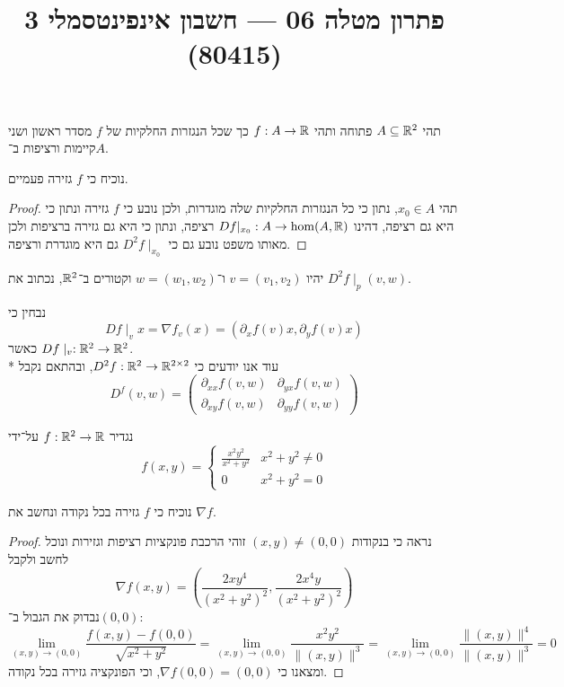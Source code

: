 
\title{פתרון מטלה 06 --- חשבון אינפינטסמלי 3 (80415)}


\maketitle
\maketitleprint{}

\Question{}
תהי $A \subseteq \mathbb{R}^2$ פתוחה ותהי $f : A \to \mathbb{R}$ כך שכל הנגזרות החלקיות של $f$ מסדר ראשון ושני קיימות ורציפות ב־$A$.

\Subquestion{}
נוכיח כי $f$ גזירה פעמיים.
\begin{proof}
	תהי $x_0 \in A$, נתון כי כל הנגזרות החלקיות שלה מוגדרות, ולכן נובע כי $f$ גזירה ונתון כי היא גם רציפה, דהינו $Df|_{x_0} : A \to \hom(A, \mathbb{R})$ רציפה,
	ונתון כי היא גם גזירה ברציפות ולכן מאותו משפט נובע גם כי $D^2 f\mid_{x_0}$ גם היא מוגדרת ורציפה.
\end{proof}

\Subquestion{}
יהיו $v = (v_1, v_2)$ ו־$w = (w_1, w_2)$ וקטורים ב־$\mathbb{R}^2$, נכתוב את $D^2 f \mid_p(v, w)$.

נבחין כי
\[
	Df\mid_v x = \nabla f_v(x) = (\partial_x f(v) x, \partial_y f(v) x)
\]
כאשר $Df\mid_v : \mathbb{R}^2 \to \mathbb{R}^2$. \\*
עוד אנו יודעים כי $D^2 f : \mathbb{R}^2 \to \mathbb{R}^{2 \times 2}$, ובהתאם נקבל
\[
	D^f(v, w) = \begin{pmatrix}
		\partial_{xx}f(v, w) & \partial_{yx}f(v, w) \\
		\partial_{xy}f(v, w) & \partial_{yy}f(v, w)
	\end{pmatrix}
\]

\Question{}
נגדיר $f : \mathbb{R}^2 \to \mathbb{R}$ על־ידי
\[
	f(x, y) = \begin{cases}
		\frac{x^2y^2}{x^2 + y^2} & x^2 + y^2 \ne 0 \\
		0 & x^2 + y^2 = 0
	\end{cases}
\]

\Subquestion{}
נוכיח כי $f$ גזירה בכל נקודה ונחשב את $\nabla f$.
\begin{proof}
	נראה כי בנקודות $(x, y) \ne (0, 0)$ זוהי הרכבת פונקציות רציפות וגזירות ונוכל לחשב ולקבל
	\[
		\nabla f (x, y) = (\frac{2xy^4}{{(x^2 + y^2)}^2}, \frac{2x^4y}{{(x^2 + y^2)}^2})
	\]
	נבדוק את הגבול ב־$(0, 0)$:
	\[
		\lim_{(x, y) \to (0, 0)} \frac{f(x, y) - f(0, 0)}{\sqrt{x^2 + y^2}}
		= \lim_{(x, y) \to (0, 0)} \frac{x^2y^2}{\lVert (x, y) \rVert^3}
		= \lim_{(x, y) \to (0, 0)} \frac{\lVert (x, y) \rVert^4}{\lVert (x, y) \rVert^3}
		= 0
	\]
	ומצאנו כי $\nabla f(0, 0) = (0, 0)$, וכי הפונקציה גזירה בכל נקודה.
\end{proof}

